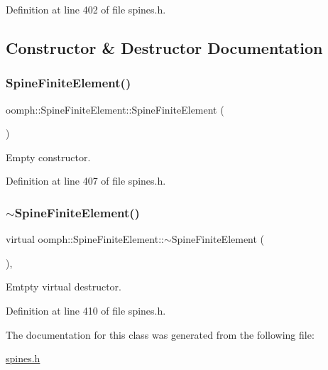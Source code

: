 Definition at line 402 of file spines.\+h.



\subsection{Constructor \& Destructor Documentation}
\mbox{\label{classoomph_1_1SpineFiniteElement_a1f6114f8f71ac42cfdd92c94666f53ad}} 
\subsubsection{\texorpdfstring{Spine\+Finite\+Element()}{SpineFiniteElement()}}
{\footnotesize\ttfamily oomph\+::\+Spine\+Finite\+Element\+::\+Spine\+Finite\+Element (\begin{DoxyParamCaption}{ }\end{DoxyParamCaption})\hspace{0.3cm}{\ttfamily [inline]}}



Empty constructor. 



Definition at line 407 of file spines.\+h.

\mbox{\label{classoomph_1_1SpineFiniteElement_afdb60867f13f454011a3e628faf41b64}} 
\subsubsection{\texorpdfstring{$\sim$\+Spine\+Finite\+Element()}{~SpineFiniteElement()}}
{\footnotesize\ttfamily virtual oomph\+::\+Spine\+Finite\+Element\+::$\sim$\+Spine\+Finite\+Element (\begin{DoxyParamCaption}{ }\end{DoxyParamCaption})\hspace{0.3cm}{\ttfamily [inline]}, {\ttfamily [virtual]}}



Emtpty virtual destructor. 



Definition at line 410 of file spines.\+h.



The documentation for this class was generated from the following file\+:\begin{DoxyCompactItemize}
\item 
\hyperlink{spines_8h}{spines.\+h}\end{DoxyCompactItemize}
